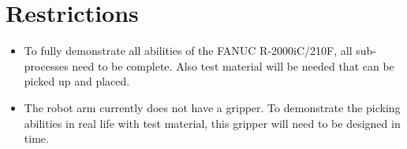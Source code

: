 
\chapter{Restrictions}

\begin{itemize}
	\item To fully demonstrate all abilities of the  FANUC R-2000iC/210F, all sub-processes need to be complete. Also test material will be needed that can be picked up and placed.
	\item The robot arm currently does not have a gripper. To demonstrate the picking abilities in real life with test material, this gripper will need to be designed in time.
\end{itemize}